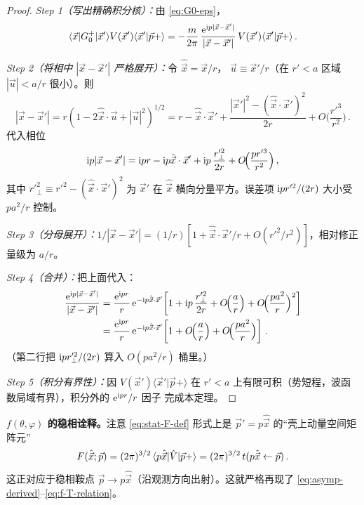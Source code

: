 \begin{proof}
\textit{Step 1（写出精确积分核）：}由 \eqref{eq:G0-eps}，
\begin{equation}
  \langle\vec x|G_0^+|\vec x'\rangle V(\vec x')\langle\vec x'|\vec p+\rangle
  = -\frac{m}{2\pi}\,\frac{\mathrm{e}^{\mathrm{i} p|\vec x-\vec x'|}}{|\vec x-\vec x'|}\,
    V(\vec x')\langle\vec x'|\vec p+\rangle\,.
\end{equation}

\textit{Step 2（将相中 $|\vec x-\vec x'|$ 严格展开）：}令 $\hat{\vec x}=\vec x/r$，
$\vec u\equiv \vec x'/r$（在 $r'<a$ 区域 $|\vec u|<a/r$ 很小）。则
\begin{equation}
  |\vec x-\vec x'|
  = r(1 - 2\hat{\vec x}\cdot\vec u + |\vec u|^2)^{1/2}
  = r - \hat{\vec x}\cdot\vec x'
    + \frac{|\vec x'|^2 - (\hat{\vec x}\cdot\vec x')^2}{2r}
    + O\!\Big(\frac{r'^3}{r^2}\Big)\,.
  \label{eq:stat-distance-expand}
\end{equation}
代入相位
\begin{equation}
  \mathrm{i} p|\vec x-\vec x'|
  = \mathrm{i} pr - \mathrm{i} p\hat{\vec x}\cdot\vec x'
    + \mathrm{i} p\,\frac{r'^2_\perp}{2r} + O\!\Big(\frac{p r'^3}{r^2}\Big)\,,
\end{equation}
其中 $r'^2_\perp \equiv r'^2 - (\hat{\vec x}\cdot\vec x')^2$ 为 $\vec x'$ 在
$\hat{\vec x}$ 横向分量平方。误差项 $\mathrm{i} p r'^2/(2r)$ 大小受 $p a^2/r$ 控制。

\textit{Step 3（分母展开）：}$1/|\vec x-\vec x'| = (1/r)[1+\hat{\vec x}\cdot\vec x'/r
+ O(r'^2/r^2)]$，相对修正量级为 $a/r$。

\textit{Step 4（合并）：}把上面代入：
\begin{align}
  \frac{\mathrm{e}^{\mathrm{i} p|\vec x-\vec x'|}}{|\vec x-\vec x'|}
  &= \frac{\mathrm{e}^{\mathrm{i} pr}}{r}\,\mathrm{e}^{-\mathrm{i} p\hat{\vec x}\cdot\vec x'}
     \!\left[1 + \mathrm{i} p\,\frac{r'^2_\perp}{2r} + O\!\Big(\frac{a}{r}\Big)
                + O\!\Big(\frac{p a^2}{r}\Big)^2\right]\nonumber\\
  &= \frac{\mathrm{e}^{\mathrm{i} pr}}{r}\,\mathrm{e}^{-\mathrm{i} p\hat{\vec x}\cdot\vec x'}
     \!\left[1 + O\!\Big(\frac{a}{r}\Big) + O\!\Big(\frac{p a^2}{r}\Big)\right]\,.
\end{align}
（第二行把 $\mathrm{i} p r'^2_\perp/(2r)$ 算入 $O(p a^2/r)$ 桶里。）

\textit{Step 5（积分有界性）：}因 $V(\vec x')\langle\vec x'|\vec p+\rangle$ 在
$r'<a$ 上有限可积（势短程，波函数局域有界），积分外的 $\mathrm{e}^{\mathrm{i} pr}/r$ 因子
完成本定理。
\end{proof}

\textbf{$f(\theta,\varphi)$ 的稳相诠释。}\quad 注意 \eqref{eq:stat-F-def} 形式上是
$\vec p'=p\hat{\vec x}$ 的``壳上动量空间矩阵元''
\begin{equation}
  F(\hat{\vec x};\vec p) = (2\pi)^{3/2}\,\langle p\hat{\vec x}|\hat{V}|\vec p+\rangle
  = (2\pi)^{3/2}\,t(p\hat{\vec x}\leftarrow\vec p)\,.
  \label{eq:stat-F-as-T}
\end{equation}
这正对应于稳相鞍点 $\vec p\to p\hat{\vec x}$（沿观测方向出射）。这就严格再现了
\eqref{eq:asymp-derived}--\eqref{eq:f-T-relation}。

